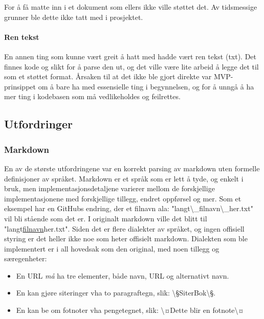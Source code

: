 \documentclass[norsk, 11pt, a4paper]{article}
\begin{document}
For å få matte inn i et dokument som ellers ikke ville støttet det.
Av tidsmessige grunner ble dette ikke tatt med i prosjektet.



\paragraph{Ren tekst}



En annen ting som kunne vært greit å hatt med hadde vært ren tekst (txt). Det finnes kode og slikt for å parse den ut, og det ville være lite arbeid å legge det til som et støttet format.
Årsaken til at det ikke ble gjort direkte var MVP-prinsippet om å bare ha med essensielle ting i begynnelsen, og for å unngå å ha mer ting i kodebasen som må vedlikeholdes og feilrettes.



\subsection{Utfordringer}



\subsubsection{Markdown}
En av de største utfordringene var en korrekt parsing av markdown uten formelle definisjoner av språket. Markdown er et språk som er lett å tyde, og enkelt i bruk, men implementasjonsdetaljene varierer mellom de forskjellige implementasjonene med forskjellige tillegg, endret oppførsel og mer.
Som et eksempel har en GitHubs endring, der et filnavn ala: "langt\textbackslash \_filnavn\textbackslash \_her.txt" vil bli stående som det er. I originalt markdown ville det blitt til "langt\uline{filnavn}her.txt". Siden det er flere dialekter av språket, og ingen offisiell styring er det heller ikke noe som heter offisielt markdown. Dialekten som ble implementert er i all hovedsak som den original, med noen tillegg og særegenheter:




\begin{itemize}
\item En URL \emph{må} ha tre elementer, både navn, URL og alternativt navn.
\item En kan gjøre siteringer vha to paragraftegn, slik: \textbackslash §SiterBok\textbackslash §.
\item En kan be om fotnoter vha pengetegnet, slik: \textbackslash ¤Dette blir en fotnote\textbackslash ¤
\end{itemize}
\end{document}
